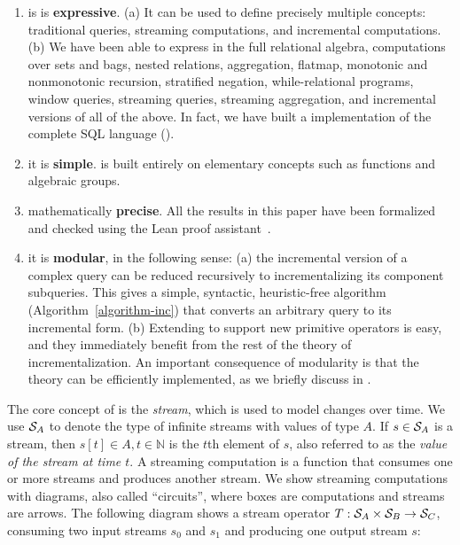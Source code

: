 \begin{enumerate}
\item is is \textbf{expressive}.  (a) It can be used to define
precisely multiple concepts: traditional queries, streaming computations, and incremental
computations.  (b) We have been able to express in \dbsp the full
relational algebra, computations over sets and bags,
nested relations, aggregation, flatmap, monotonic and nonmonotonic
recursion, stratified negation, while-relational programs, window queries,
streaming queries, streaming aggregation, and incremental versions of all
of the above.  In fact, we have built a \dbsp implementation of the
complete SQL language ().
\item it is \textbf{simple}.
\dbsp is built entirely on elementary concepts such as functions and algebraic groups.
\item mathematically \textbf{precise}.  All the results in this paper have been
formalized and checked using the Lean
proof assistant~\cite{moura-cade15}.
\item it is \textbf{modular}, in the following sense:
(a) the incremental version of a complex query can be reduced
recursively to incrementalizing its component subqueries.
This gives a simple, syntactic,
heuristic-free algorithm (Algorithm~\ref{algorithm-inc})
that converts an arbitrary \dbsp query to its incremental form.
(b) Extending \dbsp to support new primitive operators is easy,
and they immediately benefit from the rest of the theory of
incrementalization.
An important consequence of modularity is that the theory
can be efficiently implemented, as we
briefly discuss in .
\end{enumerate}

The core concept of \dbsp is the \emph{stream}, which is used to model changes
over time. We use $\mathcal{S}_{A}$ to denote the type of infinite streams with values of
type $A$. If $s \in \mathcal{S}_{A}$ is a stream,
then $s[t] \in A, t \in \mathbb{N}$ is the $t$th element of $s$, also referred to as the \emph{value of the stream at time $t$}.
A streaming computation is a function that
consumes one or more streams and produces another stream.  We show
streaming computations with diagrams, also called ``circuits'',
where boxes are computations and streams are arrows.  The following diagram
shows a stream operator $T: \mathcal{S}_{A} \times \mathcal{S}_{B} \to \mathcal{S}_{C}$,
consuming two input streams $s_0$ and $s_1$
and producing one output stream $s$:

\begin{center}
\vspace{-.2cm}
\end{center}

